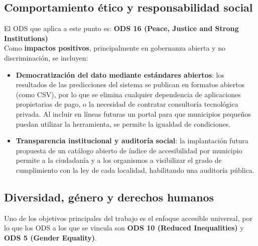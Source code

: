 \subsection{Comportamiento ético y responsabilidad social}

El ODS que aplica a este punto es: \textbf{ODS 16 (Peace, Justice and Strong Institutions)}
\\

Como \textbf{impactos positivos}, principalmente en gobernanza abierta y no discriminación, se incluyen:
\begin{itemize}
    \item \textbf{Democratización del dato mediante estándares abiertos}: los resultados de las predicciones del sistema se publican en formatos abiertos (como \gls{CSV}), por lo que se elimina cualquier dependencia de aplicaciones propietarias de pago, o la necesidad de contratar consultoría tecnológica privada. Al incluir en líneas futuras un portal para que municipios pequeños puedan utilizar la herramienta, se permite la igualdad de condiciones.
    \item \textbf{Transparencia institucional y auditoría social}: la implantación futura propuesta de un catálogo abierto de índice de accesibilidad por municipio permite a la ciudadanía y a los organismos a visibilizar el grado de cumplimiento con la ley de cada localidad, habilitando una auditoría pública.
\end{itemize}

\subsection{Diversidad, género y derechos humanos}

Uno de los objetivos principales del trabajo es el enfoque accesible universal, por lo que los ODS a los que se vincula son \textbf{ODS 10 (Reduced Inequalities)} y \textbf{ODS 5 (Gender Equality)}.
\\


